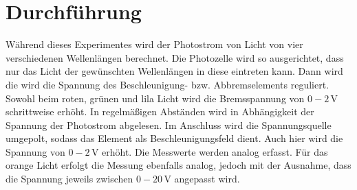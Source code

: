 \section{Durchführung}
\label{sec:Durchführung}
 
Während dieses Experimentes wird der Photostrom von Licht von vier verschiedenen Wellenlängen berechnet.
Die Photozelle wird so ausgerichtet, dass nur das Licht der gewünschten Wellenlängen in diese eintreten kann.
Dann wird die wird die Spannung des Beschleunigung- bzw. Abbremselements reguliert.
Sowohl beim roten, grünen und lila Licht wird die Bremsspannung von $0-2\, \unit{\volt}$ schrittweise erhöht.
In regelmäßigen Abständen wird in Abhängigkeit der Spannung der Photostrom abgelesen. 
Im Anschluss wird die Spannungsquelle umgepolt, sodass das Element als Beschleunigungsfeld dient.
Auch hier wird die Spannung von $0-2\,\unit{\volt}$ erhöht. Die Messwerte werden analog erfasst.
Für das orange Licht erfolgt die Messung ebenfalls analog, jedoch mit der Ausnahme, dass die Spannung jeweils zwischen $0-20\, \unit{\volt}$
angepasst wird.